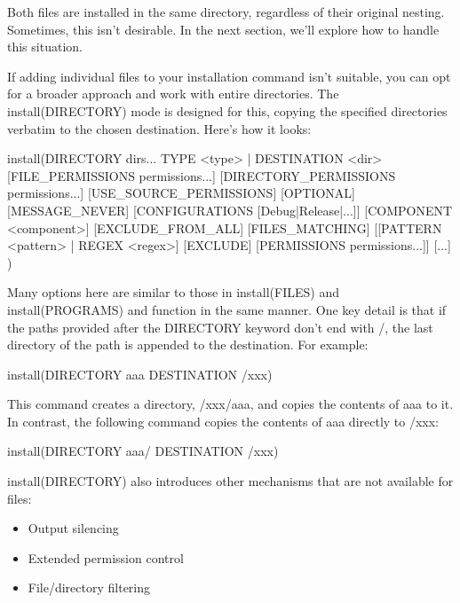 Both files are installed in the same directory, regardless of their original nesting. Sometimes, this isn’t desirable. In the next section, we’ll explore how to handle this situation.


If adding individual files to your installation command isn’t suitable, you can opt for a broader approach and work with entire directories. The install(DIRECTORY) mode is designed for this, copying the specified directories verbatim to the chosen destination. Here’s how it looks:

\begin{shell}
install(DIRECTORY dirs...
        TYPE <type> | DESTINATION <dir>
        [FILE_PERMISSIONS permissions...]
        [DIRECTORY_PERMISSIONS permissions...]
        [USE_SOURCE_PERMISSIONS] [OPTIONAL] [MESSAGE_NEVER]
        [CONFIGURATIONS [Debug|Release|...]]
        [COMPONENT <component>] [EXCLUDE_FROM_ALL]
        [FILES_MATCHING]
        [[PATTERN <pattern> | REGEX <regex>] [EXCLUDE]
        [PERMISSIONS permissions...]] [...]
)
\end{shell}

Many options here are similar to those in install(FILES) and install(PROGRAMS) and function in the same manner. One key detail is that if the paths provided after the DIRECTORY keyword don’t end with /, the last directory of the path is appended to the destination. For example:

\begin{cmake}
install(DIRECTORY aaa DESTINATION /xxx)
\end{cmake}

This command creates a directory, /xxx/aaa, and copies the contents of aaa to it. In contrast, the following command copies the contents of aaa directly to /xxx:

\begin{cmake}
install(DIRECTORY aaa/ DESTINATION /xxx)
\end{cmake}

install(DIRECTORY) also introduces other mechanisms that are not available for files:

\begin{itemize}
\item
Output silencing

\item
Extended permission control

\item
File/directory filtering
\end{itemize}

